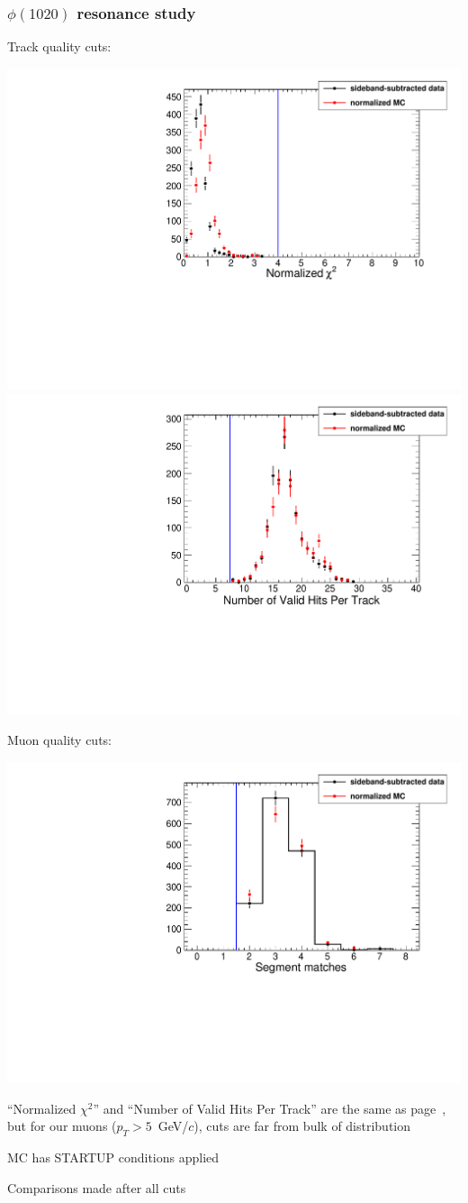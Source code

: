 \documentclass[compress]{beamer}
\begin{document}
\begin{frame}
\frametitle{$\phi(1020)$ resonance study}

Track quality cuts:

\includegraphics[width=0.5\linewidth]{phi_normchi2.pdf}
\includegraphics[width=0.5\linewidth]{phi_hits.pdf}

\vspace{0.25 cm}
Muon quality cuts:

\includegraphics[width=0.5\linewidth]{phi_matches.pdf}

\vspace{-3.5 cm}
\hfill \begin{minipage}{0.45\linewidth}
\scriptsize
``Normalized $\chi^2$'' and ``Number of Valid Hits Per Track'' are the
same as page~\pageref{page:tracking_datamc}, but for our muons ($p_T >
5$~GeV/$c$), cuts are far from bulk of distribution

\vspace{0.25 cm}
MC has STARTUP conditions applied

\vspace{0.25 cm}
Comparisons made after all cuts
\end{minipage}

\vspace{2.5 cm}
\end{frame}
\end{document}
